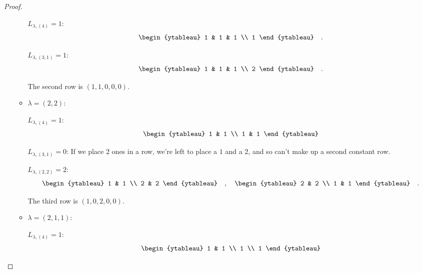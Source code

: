 \documentclass[12pt]{extarticle}
\newcommand{\<}{\langle}
\renewcommand{\>}{\rangle}
\theoremstyle{definition}
\begin{document}
\begin{proof}
\begin{enumerate}
\begin{itemize}
      $L_{\lambda, (4)} = 1$:
      \begin{align*}
        \begin{ytableau}
          1 & 1 & 1 \\
          1
        \end{ytableau}\quad.      
      \end{align*}      

      $L_{\lambda, (3,1)} = 1$:
      \begin{align*}
        \begin{ytableau}
          1 & 1 & 1 \\
          2
        \end{ytableau}\quad.      
      \end{align*}

      The second row is $(1,1,0,0,0)$.
      
    \item
      $\lambda=(2,2)$:

      $L_{\lambda, (4)} = 1$:
      \begin{align*}
        \begin{ytableau}
          1 & 1 \\
          1 & 1
        \end{ytableau}
      \end{align*}

      $L_{\lambda, (3,1)} = 0$: If we place $2$ ones in a row, we're left to place a $1$ and a $2$, and so can't make up a second constant row. 

      $L_{\lambda, (2,2)} = 2$:
      \begin{align*}
        \begin{ytableau}
          1 & 1 \\
          2 & 2
        \end{ytableau}\quad,\quad
        \begin{ytableau}
          2 & 2 \\
          1 & 1
        \end{ytableau}\quad.              
      \end{align*}
      
      The third row is $(1,0,2,0,0)$.

    \item 
      $\lambda=(2,1,1)$:

      $L_{\lambda,(4)} = 1$:
      \begin{align*}
        \begin{ytableau}
          1 & 1 \\
          1 \\
          1
        \end{ytableau}
      \end{align*}


\end{itemize}
\end{enumerate}
\end{proof}
\end{document}
